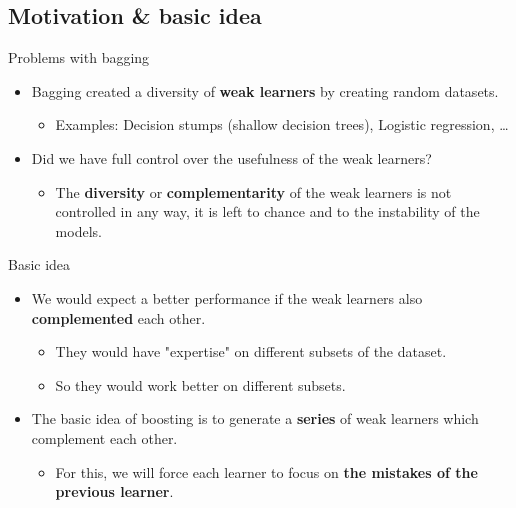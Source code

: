 \documentclass[serif, aspectratio=169]{beamer}
\begin{document}
\subsection{Motivation \& basic idea}

\begin{frame}{Problems with bagging}
    \begin{itemize}
        \itemsep1em
        \justifying
        \item Bagging created a diversity of \textbf{weak learners} by creating random datasets.
        \begin{itemize}
            \item Examples: Decision stumps (shallow decision trees), Logistic regression, \dots
        \end{itemize}
        \item Did we have full control over the usefulness of the weak learners?
        \begin{itemize}
            \item The \textbf{diversity} or \textbf{complementarity} of the weak learners is not controlled in any way, it is left to chance and to the instability of the models.
        \end{itemize}
    \end{itemize}
\end{frame}

\begin{frame}{Basic idea}
    \begin{itemize}
        \itemsep1em
        \justifying
        \item We would expect a better performance if the weak learners also \textbf{complemented} each other.
        \begin{itemize}
            \itemsep0.25em
            \item They would have "expertise" on different subsets of the dataset.
            \item So they would work better on different subsets.
        \end{itemize}
        \item The basic idea of boosting is to generate a \textbf{series} of weak learners which complement each other.
        \begin{itemize}
            \item For this, we will force each learner to focus on \textbf{the mistakes of the previous learner}.
        \end{itemize}
    \end{itemize}
\end{frame}
\end{document}
